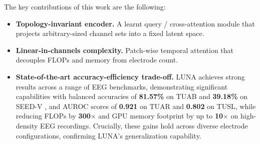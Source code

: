 The key contributions of this work are the following:
\begin{itemize}[leftmargin=*]
        \item \textbf{Topology-invariant encoder.} A learnt query / cross-attention module that projects arbitrary-sized channel sets into a fixed latent space.
        \item \textbf{Linear-in-channels complexity.} Patch-wise temporal attention that decouples FLOPs and memory from electrode count.
        \item \textbf{State-of-the-art accuracy-efficiency trade-off.} LUNA achieves strong results across a range of EEG benchmarks, demonstrating significant capabilities with balanced accuracies of \textbf{81.57\%} on TUAB and \textbf{39.18\%} on SEED-V \cite{liu2021comparing}, and AUROC scores of \textbf{0.921} on TUAR and \textbf{0.802} on TUSL, while reducing FLOPs by \textbf{300$\times$} and GPU memory footprint by up to \textbf{10$\times$} on high-density EEG recordings. Crucially, these gains hold across diverse electrode configurations, confirming LUNA's generalization capability.
\end{itemize}

